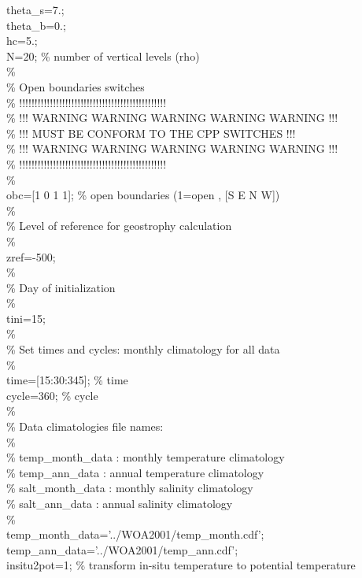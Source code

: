 theta\_s=7.;\\
theta\_b=0.;\\
hc=5.;\\
N=20; \% number of vertical levels (rho)\\
\%\\
\%  Open boundaries switches\\
\%  !!!!!!!!!!!!!!!!!!!!!!!!!!!!!!!!!!!!!!!!!!!!!!!!\\
\%  !!! WARNING WARNING WARNING WARNING WARNING  !!!\\
\%  !!!   MUST BE CONFORM TO THE CPP SWITCHES    !!!\\
\%  !!! WARNING WARNING WARNING WARNING WARNING  !!!\\
\%  !!!!!!!!!!!!!!!!!!!!!!!!!!!!!!!!!!!!!!!!!!!!!!!!\\
\%\\
obc=[1 0 1 1]; \% open boundaries (1=open , [S E N W])\\
\%\\
\%  Level of reference for geostrophy calculation\\
\%\\
zref=-500; \\
\%\\
\%  Day of initialization\\
\%\\
tini=15;  \\
\%\\
\% Set times and cycles: monthly climatology for all data\\
\%\\
time=[15:30:345];    \% time \\
cycle=360;           \% cycle \\
\%\\
\%  Data climatologies file names:\\
\%\\
\%    temp\_month\_data : monthly temperature climatology\\
\%    temp\_ann\_data   : annual temperature climatology\\
\%    salt\_month\_data : monthly salinity climatology\\
\%    salt\_ann\_data   : annual salinity climatology\\
\%\\
temp\_month\_data='../WOA2001/temp\_month.cdf';\\
temp\_ann\_data='../WOA2001/temp\_ann.cdf';\\
insitu2pot=1;   \% transform in-situ temperature to potential temperature\\

